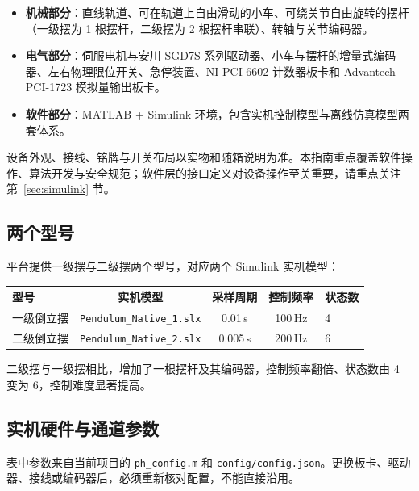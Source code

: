 \documentclass[12pt,a4paper]{article}
\begin{document}
\begin{itemize}
    \item \textbf{机械部分}：直线轨道、可在轨道上自由滑动的小车、可绕关节自由旋转的摆杆（一级摆为 1 根摆杆，二级摆为 2 根摆杆串联）、转轴与关节编码器。
    \item \textbf{电气部分}：伺服电机与安川 SGD7S 系列驱动器、小车与摆杆的增量式编码器、左右物理限位开关、急停装置、NI PCI-6602 计数器板卡和 Advantech PCI-1723 模拟量输出板卡。
    \item \textbf{软件部分}：MATLAB + Simulink 环境，包含实机控制模型与离线仿真模型两套体系。
\end{itemize}

\begin{tipbox}
    设备外观、接线、铭牌与开关布局以实物和随箱说明为准。本指南重点覆盖软件操作、算法开发与安全规范；软件层的接口定义对设备操作至关重要，请重点关注第~\ref{sec:simulink} 节。
\end{tipbox}

\subsection{两个型号}

平台提供一级摆与二级摆两个型号，对应两个 Simulink 实机模型：

\begin{center}
    \renewcommand{\arraystretch}{1.4}
    \begin{tabular}{@{}lcccl@{}}
        \toprule
        \textbf{型号} & \textbf{实机模型} & \textbf{采样周期} & \textbf{控制频率} & \textbf{状态数} \\
        \midrule
        一级倒立摆 & \texttt{Pendulum\_Native\_1.slx} & 0.01\,s & 100\,Hz & 4 \\
        二级倒立摆 & \texttt{Pendulum\_Native\_2.slx} & 0.005\,s & 200\,Hz & 6 \\
        \bottomrule
    \end{tabular}
\end{center}

二级摆与一级摆相比，增加了一根摆杆及其编码器，控制频率翻倍、状态数由 4 变为 6，控制难度显著提高。

\subsection{实机硬件与通道参数}

表中参数来自当前项目的 \texttt{ph\_config.m} 和 \texttt{config/config.json}。更换板卡、驱动器、接线或编码器后，必须重新核对配置，不能直接沿用。
\end{document}

